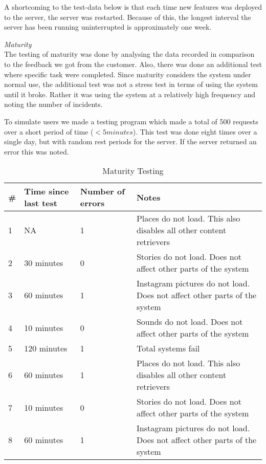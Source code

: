A shortcoming to the test-data below is that each time new features was deployed to the server, the server was restarted. Because of this, the longest interval the server has been running uninterrupted is approximately one week. 

\emph{Maturity}\\
The testing of maturity was done by analysing the data recorded in comparison to the feedback we got from the customer. Also, there was done an additional test where specific task were completed. Since maturity considers the system under normal use, the additional test was not a stress test in terms of using the system until it broke. Rather it was using the system at a relatively high frequency and noting the number of incidents.

To simulate users we made a testing program which made a total of 500 requests over a short period of time ($<5 minutes$). This test was done eight times over a single day, but with random rest periods for the server. If the server returned an error this was noted. 

\begin{table}[!htp]
\begin{center}
	\begin{tabular}{ | l | l | l | p{7cm} | }
	\hline
	\#	&Time since last test &Number of errors	& Notes \\ \hline
	1	&NA			& 1 & Places do not load. This also disables all other content retrievers\\ \hline
	2	&30 minutes		& 0 & Stories do not load. Does not affect other parts of the system\\ \hline
	3	&60 minutes		& 1 & Instagram pictures do not load. Does not affect other parts of the system\\ \hline
	4	&10 minutes		& 0 & Sounds do not load. Does not affect other parts of the system\\ \hline
	5	&120 minutes	& 1 & Total systems fail\\ \hline
	6	&60 minutes		& 1 & Places do not load. This also disables all other content retrievers\\ \hline
	7	&10 minutes		& 0 & Stories do not load. Does not affect other parts of the system\\ \hline
	8	&60 minutes		& 1 & Instagram pictures do not load. Does not affect other parts of the system\\
	 \hline
	 \end{tabular}
\end{center}
\caption{Maturity Testing}
\label{tab:Maturity Testing}
\end{table}

